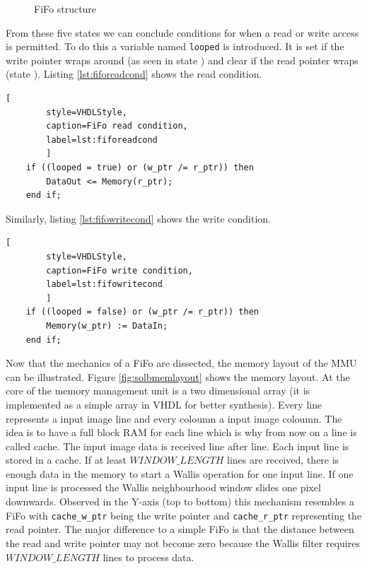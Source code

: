 \begin{figure}[tb!]
    \centering
    \begin{adjustbox}{max width=\textwidth}
        
    \end{adjustbox}
    \caption{FiFo structure}
    \label{fig:fifo}
\end{figure}

From these five states we can conclude conditions for when a read or write access is
permitted. To do this a variable named \texttt{looped} is introduced. It is set
if the write pointer wraps around (as seen in state ) and clear if the
read pointer wraps (state ). Listing \ref{lst:fiforeadcond} shows the
read condition.

\begin{minipage}{\linewidth}
    \begin{lstlisting}[
        style=VHDLStyle, 
        caption=FiFo read condition, 
        label=lst:fiforeadcond
        ]
    if ((looped = true) or (w_ptr /= r_ptr)) then
        DataOut <= Memory(r_ptr);
    end if;\end{lstlisting}
\end{minipage}

Similarly, listing \ref{lst:fifowritecond} shows the write condition.

\begin{minipage}{\linewidth}
    \begin{lstlisting}[
        style=VHDLStyle, 
        caption=FiFo write condition, 
        label=lst:fifowritecond
        ]
    if ((looped = false) or (w_ptr /= r_ptr)) then
        Memory(w_ptr) := DataIn;
    end if;\end{lstlisting}
\end{minipage}

Now that the mechanics of a FiFo are dissected, the memory layout of the
MMU can be illustrated. Figure \ref{fig:solbmemlayout} shows the memory layout.
At the core of the memory management unit is a two
dimensional array (it is implemented as a simple array in VHDL for better
synthesis). Every line represents a input image line and every coloumn a input
image coloumn. The idea is to have a full block RAM for each line which is why
from now on a line is called cache. The input image data is received line after
line. Each input line is stored in a cache. If at least $WINDOW\_LENGTH$ lines
are received, there is enough data in the memory to start a Wallis operation for
one input line. If one input line is processed the Wallis neighbourhood
window slides one pixel downwards. Observed in the Y-axis (top to bottom) this
mechanism resembles
a FiFo with \texttt{cache\_w\_ptr} being the write pointer and 
\texttt{cache\_r\_ptr} representing the read pointer. The major difference to a
simple FiFo is that the distance between the read and write pointer may not
become zero because the Wallis filter requires $WINDOW\_LENGTH$ lines to process
data.

